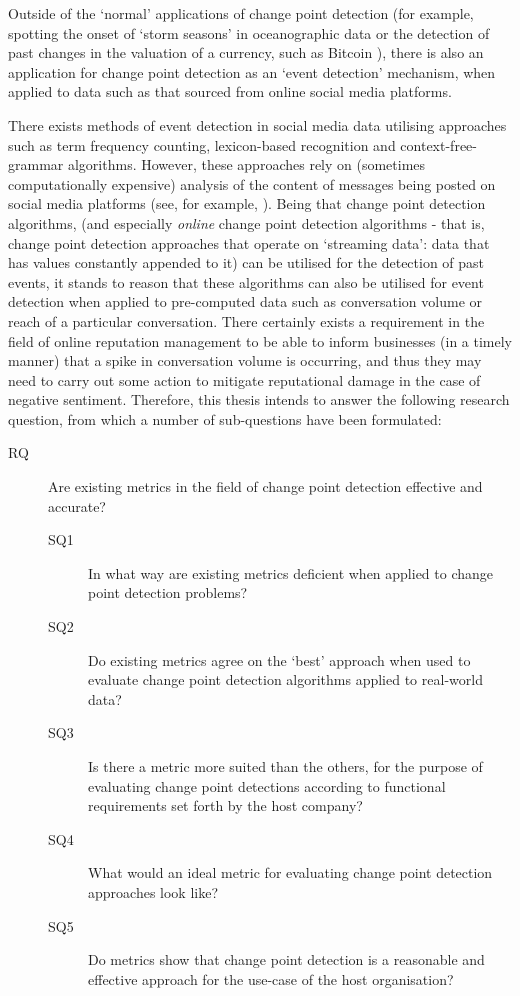 \documentclass[../main.tex]{subfiles}
\begin{document}
Outside of the `normal' applications of change point detection (for example, spotting the onset of `storm seasons' in oceanographic data \cite{Killick2011} or the detection of past changes in the valuation of a currency, such as Bitcoin \cite{Buntain2014}), there is also an application for change point detection as an `event detection' mechanism, when applied to data such as that sourced from online social media platforms.

There exists methods of event detection in social media data utilising approaches such as term frequency counting, lexicon-based recognition and context-free-grammar algorithms. However, these approaches rely on (sometimes computationally expensive) analysis of the content of messages being posted on social media platforms (see, for example, \citeauthor{Alvanaki2011} \cite{Alvanaki2011}). Being that change point detection algorithms, (and especially \emph{online} change point detection algorithms - that is, change point detection approaches that operate on `streaming data': data that has values constantly appended to it) can be utilised for the detection of past events, it stands to reason that these algorithms can also be utilised for event detection when applied to pre-computed data such as conversation volume or reach of a particular conversation. There certainly exists a requirement in the field of online reputation management to be able to inform businesses (in a timely manner) that a spike in conversation volume is occurring, and thus they may need to carry out some action to mitigate reputational damage in the case of negative sentiment. Therefore, this thesis intends to answer the following research question, from which a number of sub-questions have been formulated:

\begin{description}
    \item[RQ] Are existing metrics in the field of change point detection effective and accurate?
    \begin{description}
    \item[SQ1] In what way are existing metrics deficient when applied to change point detection problems?
    \item[SQ2] Do existing metrics agree on the `best' approach when used to evaluate change point detection algorithms applied to real-world data?
    \item[SQ3] Is there a metric more suited than the others, for the purpose of evaluating change point detections according to functional requirements set forth by the host company?
    \item[SQ4] What would an ideal metric for evaluating change point detection approaches look like?
    \item[SQ5] Do metrics show that change point detection is a reasonable and effective approach for the use-case of the host organisation?
\end{description}
\end{description}
\end{document}
